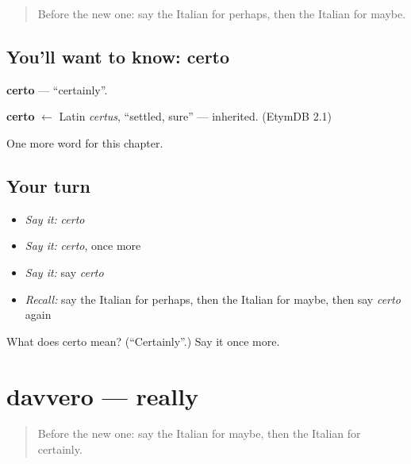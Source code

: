 \label{lesson:IT-C217-certo}



\begin{quote}
Before the new one: say the Italian for perhaps, then the Italian for maybe.
\end{quote}

\subsection*{You'll want to know: certo}
\textbf{certo} — \textquotedblleft{}certainly\textquotedblright{}.

\begin{cousinweb}
\textbf{certo} $\leftarrow$ Latin \emph{certus}, \textquotedblleft{}settled, sure\textquotedblright{} — inherited. (EtymDB 2.1)
\end{cousinweb}

\begin{grammarlens}[title={What you've built}]
One more word for this chapter.
\end{grammarlens}

\subsection*{Your turn}
\begin{itemize}
\raggedright
  \item \emph{Say it:} \emph{certo}
  \item \emph{Say it:} \emph{certo}, once more
  \item \emph{Say it:} say \emph{certo}
  \item \emph{Recall:} say the Italian for perhaps, then the Italian for maybe, then say \emph{certo} again
\end{itemize}

\begin{tcolorbox}[breakable,colback=teal!4,colframe=teal!35!black,title={Before you move on}]
What does certo mean? (\textquotedblleft{}Certainly\textquotedblright{}.) Say it once more.
\end{tcolorbox}
\section[davvero]{davvero — really}

\label{lesson:IT-C217-davvero}



\begin{quote}
Before the new one: say the Italian for maybe, then the Italian for certainly.
\end{quote}

